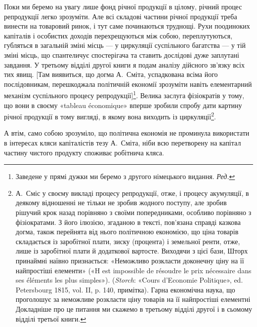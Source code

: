 Поки ми беремо на увагу лише фонд річної продукції в цілому,
річний процес репродукції легко зрозуміти. Але всі складові
частини річної продукції треба винести на товаровий ринок, і
тут саме починаються труднощі. Рухи поодиноких капіталів і
особистих доходів перехрещуються між собою, переплутуються,
губляться в загальній зміні місць — у циркуляції суспільного
багатства — у тій зміні місць, що спантеличує спостерігача та
ставить дослідові дуже заплутані завдання. У третьому відділі
другої книги я подам аналізу дійсного зв’язку всіх тих явищ.
[Там виявиться, що догма А.~Сміта, успадкована всіма його послідовникам,
перешкоджала політичній економії зрозуміти навіть
елементарний механізм суспільного процесу репродукції]\footnote*{
Заведене у прямі дужки ми беремо з другого німецького видання.
\emph{Ред.}
}. Велика
заслуга фізіократів у тому, що вони в своєму «tableau économique»
вперше зробили спробу дати картину річної продукції
в тому вигляді, в якому вона виходить із циркуляції\footnote{
А.~Сміс у своєму викладі процесу репродукції, отже, і процесу
акумуляції, в деякому відношенні не тільки не зробив жодного поступу,
але зробив рішучий крок назад порівняно з своїми попередниками, особливо
порівняно з фізіократами. З його ілюзією, згаданою в тексті, пов’язана
справді казкова догма, також перейнята від нього політичною економією,
що ціна товарів складається із заробітної плати, зиску (процента)
і земельної ренти, отже, лише із заробітної плати й додаткової вартосте.
Виходячи з цієї бази, Шторх принаймні наївно признається: «Неможливо
розкласти доконечну ціну на її найпростіші елементи» («H est
impossible de résoudre le prix nécessaire dans ses éléments les plus simples»).
(\emph{Storch}: «Cours d’Economie Politique», ed. Petersbourg 1815,
vol. II, p. 140, примітка). Гарна економічна наука, що проголошує за
неможливе розкласти ціну товарів на її найпростіші елементні Докладніше
про це питання ми скажемо в третьому відділі другої і в сьомому
відділі третьої книги.
}.

А втім, само собою зрозуміло, що політична економія не проминула
використати в інтересах кляси капіталістів тезу А.~Сміта,
ніби всю перетворену на капітал частину чистого продукту споживає
робітнича кляса.
